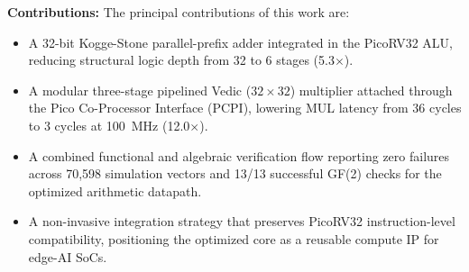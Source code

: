 \textbf{Contributions:} The principal contributions of this work are:
\begin{itemize}
\item A 32-bit Kogge-Stone parallel-prefix adder integrated in the PicoRV32 ALU, reducing structural logic depth from 32 to 6 stages (5.3$\times$).
\item A modular three-stage pipelined Vedic ($32\times32$) multiplier attached through the Pico Co-Processor Interface (PCPI), lowering MUL latency from 36 cycles to 3 cycles at 100~MHz (12.0$\times$).
\item A combined functional and algebraic verification flow reporting zero failures across 70{,}598 simulation vectors and 13/13 successful GF(2) checks for the optimized arithmetic datapath.
\item A non-invasive integration strategy that preserves PicoRV32 instruction-level compatibility, positioning the optimized core as a reusable compute IP for edge-AI SoCs.
\end{itemize}
